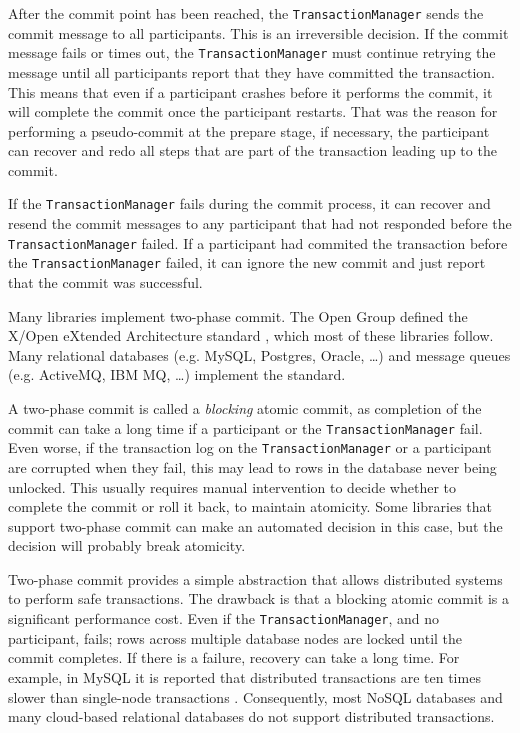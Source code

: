 After the commit point has been reached, the \texttt{TransactionManager} sends the commit message to all participants.
This is an irreversible decision.
If the commit message fails or times out, the \texttt{TransactionManager} must continue retrying the message
until all participants report that they have committed the transaction.
This means that even if a participant crashes before it performs the commit, it will complete the commit once the participant restarts.
That was the reason for performing a pseudo-commit at the prepare stage,
if necessary, the participant can recover and redo all steps that are part of the transaction leading up to the commit.

If the \texttt{TransactionManager} fails during the commit process,
it can recover and resend the commit messages to any participant that had not responded before the \texttt{TransactionManager} failed.
If a participant had commited the transaction before the \texttt{TransactionManager} failed,
it can ignore the new commit and just report that the commit was successful.

Many libraries implement two-phase commit.
The Open Group defined the X/Open eXtended Architecture standard \cite{xa-std}, which most of these libraries follow.
Many relational databases (e.g. MySQL, Postgres, Oracle, \dots) and message queues (e.g. ActiveMQ, IBM MQ, \dots)
implement the standard.

A two-phase commit is called a \emph{blocking} atomic commit,
as completion of the commit can take a long time if a participant or the \texttt{TransactionManager} fail.
Even worse, if the transaction log on the \texttt{TransactionManager} or a participant are corrupted when they fail,
this may lead to rows in the database never being unlocked.
This usually requires manual intervention to decide whether to complete the commit or roll it back, to maintain atomicity.
Some libraries that support two-phase commit can make an automated decision in this case,
but the decision will probably break atomicity.

Two-phase commit provides a simple abstraction that allows distributed systems to perform safe transactions.
The drawback is that a blocking atomic commit is a significant performance cost.
Even if the \texttt{TransactionManager}, and no participant, fails;
rows across multiple database nodes are locked until the commit completes.
If there is a failure, recovery can take a long time.
For example, in MySQL it is reported that distributed transactions are ten times slower than single-node transactions \cite{distrib-mysql}.
Consequently, most NoSQL databases and many cloud-based relational databases do not support distributed transactions.

